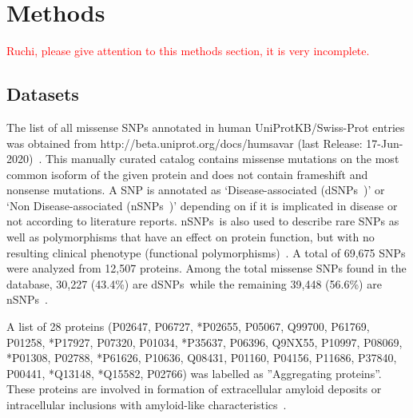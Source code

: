 \documentclass[10pt,letterpaper]{article}
\newcommand{\dSNPs}{dSNPs~}
\newcommand{\nSNPs}{nSNPs~}
\newcommand{\grace}[1]{\textcolor{red}{#1}}
\begin{document}




\section{Methods}
\grace{Ruchi, please give attention to this methods section, it is very incomplete.} 
\subsection*{Datasets}
The list of all missense SNPs annotated in human UniProtKB/Swiss-Prot entries was obtained from http://beta.uniprot.org/docs/humsavar (last Release: 17-Jun-2020)~\cite{Yip2008}. This manually curated catalog contains missense mutations on the most common isoform of the given protein and does not contain frameshift and nonsense mutations. A SNP is annotated as `Disease-associated (\dSNPs)' or `Non Disease-associated (\nSNPs)' depending on if it is implicated in disease or not according to literature reports. \nSNPs is also used to describe rare SNPs as well as polymorphisms that have an effect on protein function, but with no resulting clinical phenotype (functional polymorphisms)~\cite{Yip2008}. A total of 69,675 SNPs were analyzed from 12,507 proteins. Among the total missense SNPs found in the database, 30,227 (43.4\%) are \dSNPs while the remaining 39,448 (56.6\%) are \nSNPs.  

A list of 28 proteins (P02647, P06727, *P02655, P05067, Q99700, P61769, P01258, *P17927, P07320, P01034, *P35637, P06396, Q9NX55, P10997, P08069, *P01308, P02788, *P61626, P10636, Q08431, P01160, P04156, P11686, P37840, P00441, *Q13148, *Q15582, P02766) was labelled as ”Aggregating proteins”. These proteins are involved in formation of extracellular amyloid deposits or intracellular inclusions with amyloid-like characteristics~\cite{Chiti2006}.
\end{document}
